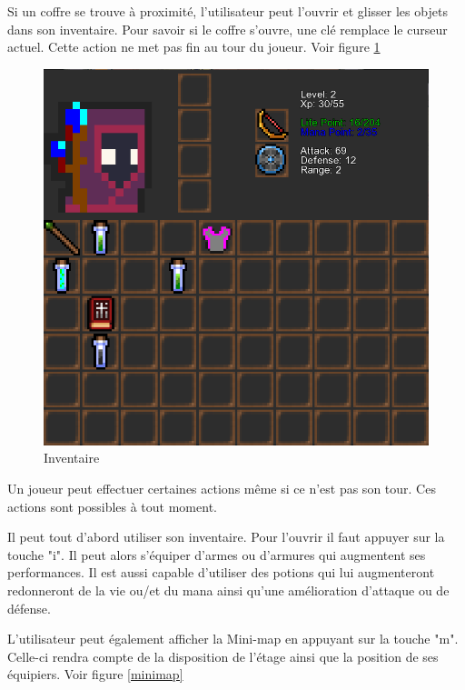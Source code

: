 \documentclass[a4paper, 12pt, twoside]{article}
\begin{document}
Si un coffre se trouve à proximité, l'utilisateur peut l'ouvrir et glisser les objets dans son inventaire. Pour savoir si le coffre s'ouvre, une clé remplace le curseur actuel. Cette action ne met pas fin au tour du joueur. Voir figure \ref{inventaire}\\\par
\begin{figure}[H]
    \center
	\includegraphics[scale=0.3]{Inventaire}
	\caption{Inventaire}
	\label{inventaire}
\end{figure}
Un joueur peut effectuer certaines actions même si ce n'est pas son tour. Ces actions sont possibles à tout moment.\par
Il peut tout d'abord utiliser son inventaire. Pour l'ouvrir il faut appuyer sur la touche "i". Il peut alors s'équiper d'armes ou d'armures qui augmentent ses performances. Il est aussi capable d'utiliser des potions qui lui augmenteront redonneront de la vie ou/et du mana ainsi qu'une amélioration d'attaque ou de défense.\\\par
L'utilisateur peut également afficher la Mini-map en appuyant sur la touche "m". Celle-ci rendra compte de la disposition de l'étage ainsi que la position de ses équipiers. Voir figure \ref{minimap}\\\par
\end{document}
